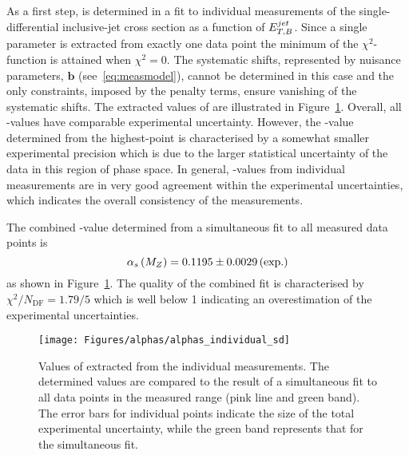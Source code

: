 As a first step, \asz is determined in a fit to individual measurements of the single-differential inclusive-jet cross section as a function of $\mbox{$E_{T,B}^{jet}$}$. Since a single parameter is extracted from exactly one data point the minimum of the $\chi^2$-function is attained when $\chi^2=0$. The systematic shifts, represented by nuisance parameters, $\mathbf{b}$ (see~\eqref{eq:measmodel}), cannot be determined in this case and the only constraints, imposed by the penalty terms, ensure vanishing of the systematic shifts. The extracted values of \asz are illustrated in Figure~\ref{fig:alphassinglediffindividual}. Overall, all \as-values have comparable experimental uncertainty. However, the \as-value determined from the highest-\etjetb point is characterised by a somewhat smaller experimental precision which is due to the larger statistical uncertainty of the data in this region of phase space. In general, \as-values from individual measurements are in very good agreement within the experimental uncertainties, which indicates the overall consistency of the measurements.

The combined \asz-value determined from a simultaneous fit to all measured data points is
\begin{equation}
 \asz = 0.1195 \pm 0.0029 \left( \text{exp.} \right) %
 \label{eq:assingledifval}
\end{equation}
as shown in Figure~\ref{fig:alphassinglediffindividual}. The quality of the combined fit is characterised by $\chi^2/N_\text{DF}=1.79/5$ which is well below 1 indicating an overestimation of the experimental uncertainties.

\begin{figure}[t]
 \centering
 \texttt{[image: Figures/alphas/alphas\_individual\_sd]}
 \caption{Values of \asz extracted from the individual \dsdetjetb measurements. The determined values are compared to the result of a simultaneous fit to all data points in the measured \etjetb range (pink line and green band). The error bars for individual points indicate the size of the total experimental uncertainty, while the green band represents that for the simultaneous fit.}
 \label{fig:alphassinglediffindividual}
\end{figure}

